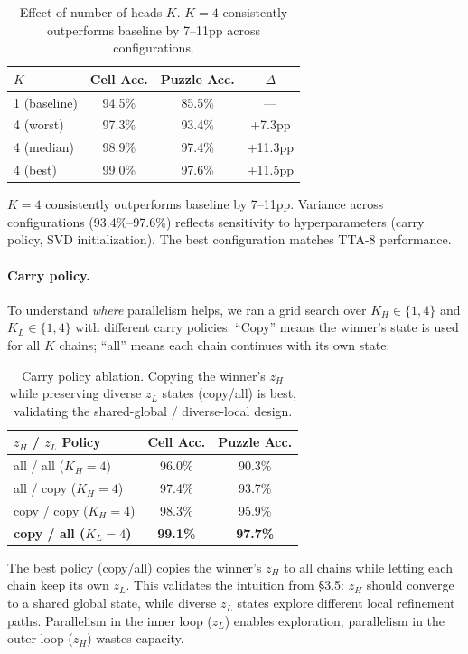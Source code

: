\begin{table}[h]
\centering
\begin{tabular}{lccc}
\toprule
$K$ & Cell Acc. & Puzzle Acc. & $\Delta$ \\
\midrule
1 (baseline) & 94.5\% & 85.5\% & --- \\  %
4 (worst) & 97.3\% & 93.4\% & +7.3pp \\  %
4 (median) & 98.9\% & 97.4\% & +11.3pp \\  %
4 (best) & 99.0\% & 97.6\% & +11.5pp \\  %
\bottomrule
\end{tabular}
\caption{Effect of number of heads $K$. $K{=}4$ consistently outperforms
baseline by 7--11pp across configurations.}
\label{tab:k-ablation}
\end{table}
%
$K{=}4$ consistently outperforms baseline by 7--11pp. Variance across
configurations (93.4\%--97.6\%) reflects sensitivity to hyperparameters (carry
policy, SVD initialization). The best configuration matches TTA-8 performance.

\paragraph{Carry policy.} To understand \emph{where} parallelism helps, we ran a
grid search over $K_H \in \{1,4\}$ and $K_L \in \{1,4\}$ with different carry
policies. ``Copy'' means the winner's state is used for all $K$ chains;
``all'' means each chain continues with its own state:
%
\begin{table}[h]
\centering
\begin{tabular}{lcc}
\toprule
$z_H$ / $z_L$ Policy & Cell Acc. & Puzzle Acc. \\
\midrule
all / all ($K_H{=}4$) & 96.0\% & 90.3\% \\  %
all / copy ($K_H{=}4$) & 97.4\% & 93.7\% \\  %
copy / copy ($K_H{=}4$) & 98.3\% & 95.9\% \\  %
\textbf{copy / all ($K_L{=}4$)} & \textbf{99.1\%} & \textbf{97.7\%} \\  %
\bottomrule
\end{tabular}
\caption{Carry policy ablation. Copying the winner's $z_H$ while preserving
diverse $z_L$ states (copy/all) is best, validating the shared-global /
diverse-local design.}
\label{tab:carry-policy}
\end{table}
%
The best policy (copy/all) copies the winner's $z_H$ to all chains while
letting each chain keep its own $z_L$. This validates the intuition from
\S3.5: $z_H$ should converge to a shared global state, while diverse $z_L$
states explore different local refinement paths. Parallelism in the inner loop
($z_L$) enables exploration; parallelism in the outer loop ($z_H$) wastes
capacity.

